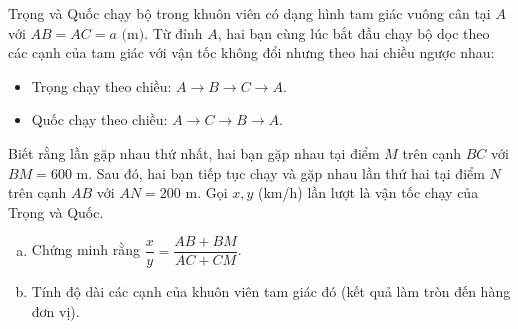 \begin{bt}%
Trọng và Quốc chạy bộ trong khuôn viên có dạng hình tam giác vuông cân tại $A$ với $AB = AC = a\text{ (m)}$. Từ đỉnh $A$, hai bạn cùng lúc bắt đầu chạy bộ dọc theo các cạnh của tam giác với vận tốc không đổi nhưng theo hai chiều ngược nhau:
\begin{itemize}
	\item Trọng chạy theo chiều: $A \to B \to C \to A$.
	\item Quốc chạy theo chiều: $A \to C \to B \to A$.
\end{itemize}
Biết rằng lần gặp nhau thứ nhất, hai bạn gặp nhau tại điểm $M$ trên cạnh $BC$ với $BM = 600\text{ m}$. Sau đó, hai bạn tiếp tục chạy và gặp nhau lần thứ hai tại điểm $N$ trên cạnh $AB$ với $AN = 200\text{ m}$. Gọi $x, y$ (km/h) lần lượt là vận tốc chạy của Trọng và Quốc.
\begin{enumerate}[a)]
	\item Chứng minh rằng $\dfrac{x}{y} = \dfrac{AB + BM}{AC + CM}$.
	\item Tính độ dài các cạnh của khuôn viên tam giác đó (kết quả làm tròn đến hàng đơn vị).
\end{enumerate}
\end{bt}
